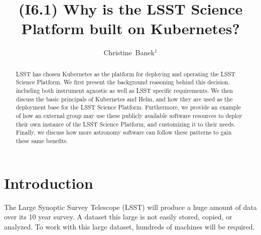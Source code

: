 \documentclass[11pt,twoside]{article}
\begin{document}
\title{(I6.1) Why is the LSST Science Platform built on Kubernetes?}


\author{Christine~Banek$^1$}





\newcommand{\code}[1]{\texttt{#1}}

\begin{abstract}
LSST has chosen Kubernetes as the platform for deploying and
operating the LSST Science Platform.  We first present the
background reasoning behind this decision, including both
instrument agnostic as well as LSST specific requirements.
We then discuss the basic principals of Kubernetes and Helm, and how
they are used as the deployment base for the LSST Science Platform.
Furthermore, we provide an example of how an external group may
use these publicly available software resources to deploy their own
instance of the LSST Science Platform, and customizing it
to their needs.  Finally, we discuss how more astronomy software
can follow these patterns to gain these same benefits.
\end{abstract}

\section{Introduction}

The Large Synoptic Survey Telescope (LSST) will produce a huge amount
of data over its 10 year survey. A dataset this large is not easily stored,
copied, or analyzed.  To work with this large dataset, hundreds of
machines will be required.
\end{document}
